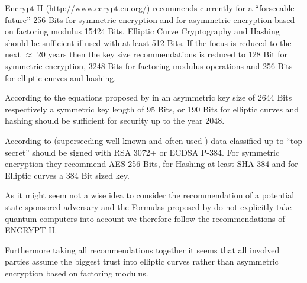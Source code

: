 \href{http://www.ecrypt.eu.org/}{Encrypt II (http://www.ecrypt.eu.org/)} recommends currently for a ``forseeable future'' 256 Bits for symmetric encryption and for asymmetric encryption based on factoring modulus 15424 Bits. Elliptic Curve Cryptography and Hashing should be sufficient if used with at least 512 Bits. If the focus is reduced to the next $\approx$ 20 years then the key size recommendations is reduced to 128 Bit for symmetric encryption, 3248 Bits for factoring modulus operations and 256 Bits for elliptic curves and hashing.

According to the equations proposed by \citeauthor{Lenstra04keylength.} in \cite{Lenstra04keylength.} an asymmetric key size of 2644 Bits respectively a symmetric key length of 95 Bits, or 190 Bits for elliptic curves and hashing should be sufficient for security up to the year 2048. 

According to \cite{CNSASuite} (superseeding well known and often used \cite{nsa-fact-sheet-B}) data classified up to ``top secret'' should be signed with RSA 3072+ or ECDSA P-384.  For symmetric encryption they recommend AES 256 Bits, for Hashing at least SHA-384 and for Elliptic curves a 384 Bit sized key.

As it might seem not a wise idea to consider the recommendation of a potential state sponsored adversary and the Formulas proposed by \citeauthor{Lenstra04keylength.} do not explicitly take quantum computers into account we therefore follow the recommendations of ENCRYPT II.

Furthermore taking all recommendations together it seems that all involved parties assume the biggest trust into elliptic curves rather than asymmetric encryption based on factoring modulus.

